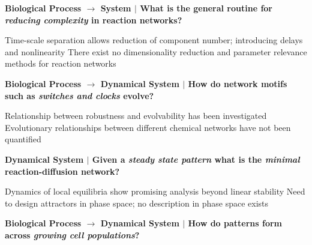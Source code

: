 \documentclass[a0,portrait]{a0poster}
\begin{document}
\begin{tcolorbox}[boxrule=2pt,arc=3.4pt,boxsep=2mm]
	\begin{center}
		\textbf{\color{Grey}Biological Process $\rightarrow$ System \color{Black}$|$
		What is the general routine for \textit{reducing complexity} in reaction networks?}
	\end{center}
\end{tcolorbox}

\begin{itemize}[leftmargin=5cm]
	\up Time-scale separation allows reduction of component number; introducing delays and nonlinearity
	\down There exist no dimensionality reduction and parameter relevance methods for reaction networks
\end{itemize}

\begin{tcolorbox}[boxrule=2pt,arc=3.4pt,boxsep=2mm]
	\begin{center}
		\textbf{\color{Grey}Biological Process $\rightarrow$ Dynamical System \color{Black}$|$
		How do network motifs such as \textit{switches and clocks} evolve?}
	\end{center}
\end{tcolorbox}

\begin{itemize}[leftmargin=5cm]
	\up Relationship between robustness and evolvability has been investigated \cite{Daniels2008SloppinessBiology}
	\down Evolutionary relationships between different chemical networks have not been quantified
\end{itemize}

\begin{tcolorbox}[boxrule=2pt,arc=3.4pt,boxsep=2mm]
	\begin{center}
		\textbf{\color{Grey}Dynamical System \color{Black}$|$
		Given a \textit{steady state pattern} what is the \textit{minimal} reaction-diffusion network?}
	\end{center}
\end{tcolorbox}

\begin{itemize}[leftmargin=5cm]
	\up Dynamics of local equilibria show promising analysis beyond linear stability \cite{Halatek2018}
	\down Need to design attractors in phase space; no description in phase space exists
\end{itemize}

\begin{tcolorbox}[boxrule=2pt,arc=3.4pt,boxsep=2mm]
	\begin{center}
		\textbf{\color{Grey}Biological Process $\rightarrow$ Dynamical System \color{Black}$|$
		How do patterns form across \textit{growing cell populations}?}
	\end{center}
\end{tcolorbox}
\end{document}
